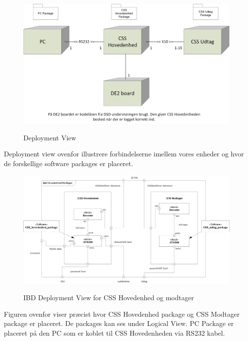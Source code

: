 
\begin{figure}[!htb]
     {\includegraphics[width=\textwidth]{billeder/uml/deployment_model}}
     \caption{Deployment View}
     \label{fig:Deployment model}
\end{figure}

Deployment view ovenfor illustrere forbindelserne imellem vores enheder og hvor de forskellige software packages er placeret.

\begin{figure}[!htb]
     {\includegraphics[width=\textwidth]{billeder/uml/CSS_Hovedenhed_modtager_deployment}}
     \caption{IBD Deployment View for CSS Hovedenhed og modtager }
     \label{fig:IBD Deployment model}
\end{figure}

Figuren ovenfor viser præcist hvor CSS Hovedenhed package og CSS Modtager package er placeret. De packages kan ses under Logical View. PC Package er placeret på den PC som er koblet til CSS Hovedenheden via RS232 kabel.